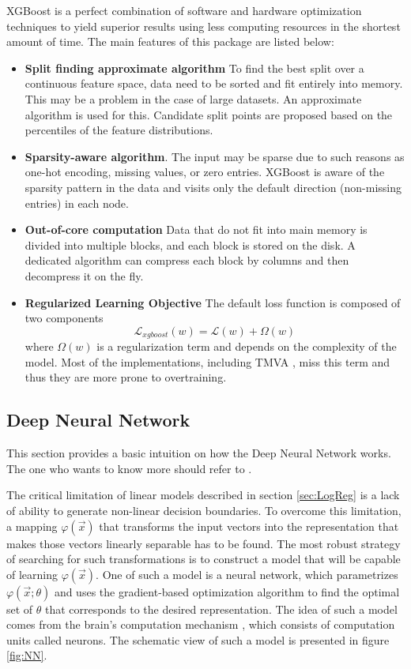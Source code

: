 XGBoost is a perfect combination of software and hardware optimization techniques to yield superior results using less computing resources in the shortest amount of time. The main features of this package are listed below: 
\begin{itemize}
    \item \textbf{Split finding approximate algorithm} To find the best split over a continuous feature space, data need to be sorted and fit entirely into memory. This may be a problem in the case of large datasets.
    An approximate algorithm is used for this. Candidate split points are proposed based on the percentiles of the feature distributions.
    \item  \textbf{Sparsity-aware algorithm}. The input may be sparse due to such reasons as one-hot encoding, missing values, or zero entries. XGBoost is aware of the sparsity pattern in the data and visits only the default direction (non-missing entries) in each node.
    \item  \textbf{Out-of-core computation} 
    Data that do not fit into main memory is divided into multiple blocks, and each block is stored on the disk. A dedicated algorithm can compress each block by columns and then decompress it on the fly.
    \item \textbf{Regularized Learning Objective} The default loss function is composed of two components 
    \begin{equation}
        \mathcal{L}_{xgboost}(w) = \mathcal{L}(w) + \Omega(w)
    \end{equation}
    where $\Omega(w)$ is a  regularization term and depends on the complexity of the model. Most of the implementations, including TMVA \cite{TMVA}, miss this term and thus they are more prone to overtraining. 
\end{itemize}


\subsection{Deep Neural Network}
\label{sec:DNN}
This section provides a basic intuition on how the Deep Neural Network works. The one who wants to know more should refer to \cite{DLBook}.  

The critical limitation of linear models described in section \ref{sec:LogReg} is a lack of ability to generate non-linear decision boundaries. To overcome this limitation, a mapping $\varphi(\vec{x})$ that transforms the input vectors into the representation that makes those vectors linearly separable has to be found. The most robust strategy of searching for such transformations is to construct a model that will be capable of learning $\varphi(\vec{x})$. One of such a model is a neural network, which parametrizes $\varphi(\vec{x};\theta)$ and uses the gradient-based optimization algorithm to find the optimal set of $\theta$ that corresponds to the desired representation. The idea of such a model comes from the brain's computation mechanism \cite{NN_brain}, which consists of computation units called neurons. The schematic view of such a model is presented in figure \ref{fig:NN}. 

